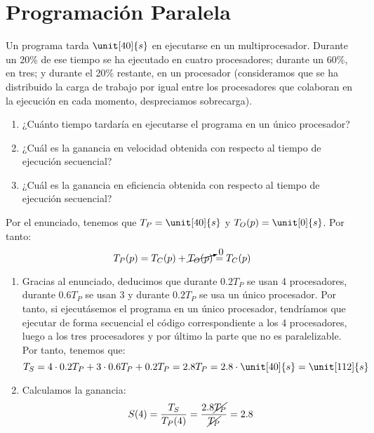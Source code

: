 \section{Programación Paralela}

\begin{ejercicio}
    Un programa tarda $\unit[40]{s}$ en ejecutarse en un multiprocesador. Durante un 20\% de ese tiempo se
    ha ejecutado en cuatro procesadores; durante un 60\%, en tres; y durante el 20\% restante, en un procesador
    (consideramos que se ha distribuido la carga de trabajo por igual entre los procesadores que colaboran en la
    ejecución en cada momento, despreciamos sobrecarga).
    \begin{enumerate}
        \item ¿Cuánto tiempo tardaría en ejecutarse el programa
        en un único procesador?
        \item ¿Cuál es la ganancia en velocidad obtenida con respecto al tiempo de ejecución
        secuencial?
        \item ¿Cuál es la ganancia en eficiencia obtenida con respecto al tiempo de ejecución
        secuencial?
    \end{enumerate}

    Por el enunciado, tenemos que $T_P=\unit[40]{s}$ y $T_O(p)=\unit[0]{s}$. Por tanto:
        \begin{equation*}
            T_P(p) = T_C(p) + \cancelto{0}{T_O(p)} = T_C(p)
        \end{equation*}
    \begin{enumerate}
        \item
        Gracias al enunciado, deducimos que durante $0.2T_P$ se usan 4 procesadores,
        durante $0.6T_P$ se usan 3 y durante $0.2T_P$ se usa un único procesador.
        Por tanto, si ejecutásemos el programa en un único procesador, tendríamos
        que ejecutar de forma secuencial el código correspondiente a los 4 procesadores, luego a los tres procesadores y por último la parte que no es paralelizable.
        Por tanto, tenemos que:
        \begin{equation*}
            T_S = 4\cdot 0.2T_P + 3\cdot 0.6T_P + 0.2T_P = 2.8T_P = 2.8 \cdot \unit[40]{s} = \unit[112]{s}
        \end{equation*}

        \item Calculamos la ganancia:
        \begin{equation*}
            S(4) = \dfrac{T_S}{T_P(4)} = \dfrac{2.8\cancel{T_P}}{\cancel{T_P}} = 2.8 
        \end{equation*}


\end{enumerate}
\end{ejercicio}
